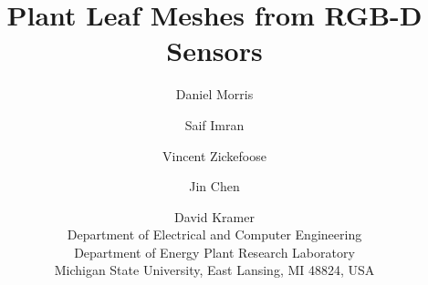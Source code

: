 \documentclass[10pt,twocolumn,letterpaper]{article}
\begin{document}
\title{Plant Leaf Meshes from RGB-D Sensors}

\author{ 
Daniel Morris \and Saif Imran \and Vincent Zickefoose \and Jin Chen \and David Kramer\\
Department of Electrical and Computer Engineering\\
Department of Energy Plant Research Laboratory\\
Michigan State University, East Lansing, MI 48824, USA
}

\maketitle

\begin{abstract}

\end{abstract}














{\small


}
\end{document}
